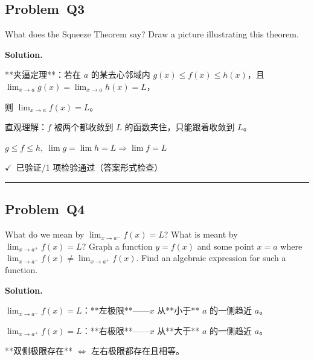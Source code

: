 \documentclass[12pt, a4paper]{article}
\newcommand{\problem}[1]{\subsection*{Problem~#1}}
\newcommand{\solution}{%
  \par\noindent
  {\color{solutiongreen}\bfseries Solution.}\par
}
\newcommand{\verifyok}{\textcolor{solutiongreen}{\ensuremath{\checkmark}\ 已验证}}
\begin{document}
\problem{Q3}

\begin{stepbox}
What does the Squeeze Theorem say? Draw a picture illustrating this theorem.
\end{stepbox}

\solution

\begin{stepbox}
**夹逼定理**：若在 $a$ 的某去心邻域内 $g(x)\le f(x)\le h(x)$，且 $\lim_{x\to a}g(x)=\lim_{x\to a}h(x)=L$，
\end{stepbox}

\begin{stepbox}
则 $\lim_{x\to a}f(x)=L$。
\end{stepbox}

\begin{stepbox}
直观理解：$f$ 被两个都收敛到 $L$ 的函数夹住，只能跟着收敛到 $L$。
\end{stepbox}

\begin{center}
$\boxed{g\le f\le h,\ \lim g=\lim h=L \Rightarrow \lim f = L}$
\end{center}

\begin{verifybox}\small \verifyok{}/1 项检验通过（答案形式检查） \end{verifybox}

\vspace{0.8em}\hrule\vspace{0.8em}

\problem{Q4}

\begin{stepbox}
What do we mean by $\lim_{x \to a^-} f(x) = L$? What is meant by $\lim_{x \to a^+} f(x) = L$? Graph a function $y = f(x)$ and some point $x = a$ where $\lim_{x \to a^-} f(x) \neq \lim_{x \to a^+} f(x)$. Find an algebraic expression for such a function.
\end{stepbox}

\solution

\begin{stepbox}
$\lim_{x\to a^-}f(x)=L$：**左极限**——$x$ 从**小于** $a$ 的一侧趋近 $a$。
\end{stepbox}

\begin{stepbox}
$\lim_{x\to a^+}f(x)=L$：**右极限**——$x$ 从**大于** $a$ 的一侧趋近 $a$。
\end{stepbox}

\begin{stepbox}
**双侧极限存在** $\iff$ 左右极限都存在且相等。
\end{stepbox}
\end{document}
